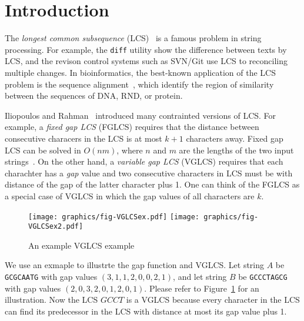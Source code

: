 \section{Introduction} %
\label{sec:Introduction}


The {\em longest common subsequence} (LCS)~\cite{Hirschberg1975ALS} is
a famous problem in string processing.  For example, the {\tt diff}
utility show the difference between texts by LCS, and the revison
control systems such as SVN/Git use LCS to reconciling multiple
changes.  In bioinformatics, the best-known application of the LCS
problem is the sequence alignment~\cite{mount2001bioinformatics,
Ann2010EfficientAF}, which identify the region of similarity between
the sequences of DNA, RND, or protein.


\iffalse 最長共同子序列 (\emph{longest common subsequence}, LCS) 廣泛
地使用在各個應用上。在多核心平台下，大多數的研究專注於如何高效率地在波
前平行 (wavefront parallelism)，而 Jiaoyun Yang ~\cite{jiaoyun} 提出的
論文中改變一般的 LCS 遞迴定義以得到更好快取使用率。在這篇論文中，針對
在 Iliopoulos 和 Rahman ~\cite{iliopoulos} 提及的約束條件下的 LCS 問題
使用相關的想法來改善效能。\fi


Iliopoulos and Rahman~\cite{Rahman2006AlgorithmsFC} introduced many
contrainted versions of LCS.  For example, a {\em fixed gap LCS}
(FGLCS) requires that the distance between consecutive characers in
the LCS is at most $k + 1$ characters away.  Fixed gap LCS can be
solved in $O(nm)$, where $n$ and $m$ are the lengths of the two input
strings~\cite{citation}.  On the other hand, a {\em variable   gap
LCS} (VGLCS) requires that each charachter has a {\em gap} value and
two consecutive characters in LCS must be with distance of the gap of
the latter character plus 1.  One can think of the FGLCS as a special
case of VGLCS in which the gap values of all characters are $k$.

\begin{figure}[!thb]
  \centering
  \texttt{[image: graphics/fig-VGLCSex.pdf]}
  \texttt{[image: graphics/fig-VGLCSex2.pdf]}
  \caption{An example VGLCS example}    \label{fig:VGLCSex}
\end{figure}

We use an exmaple to illustrte the gap function and VGLCS.  Let string
$A$ be {\tt GCGCAATG} with gap values $(3, 1, 1, 2, 0, 0, 2, 1)$, and
let string $B$ be {\tt GCCCTAGCG} with gap values $(2, 0, 3, 2, 0, 1,
2, 0, 1)$.  Please refer to Figure~\ref{fig:VGLCSex} for an
illustration.  Now the LCS $GCCT$ is a VGLCS because every character
in the LCS can find its predecessor in the LCS with distance at most
its gap value plus 1.

